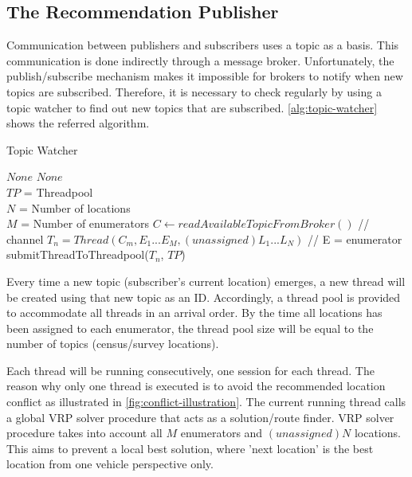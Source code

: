 \documentclass[conference]{IEEEtran}
\begin{document}
\subsection{The Recommendation Publisher}
\label{ssec:recommendation-publisher}
Communication between publishers and subscribers uses a topic as a basis. This communication is done indirectly through a message broker. Unfortunately, the publish/subscribe mechanism makes it impossible for brokers to notify when new topics are subscribed. Therefore, it is necessary to check regularly by using a topic watcher to find out new topics that are subscribed. \autoref{alg:topic-watcher} shows the referred algorithm.

\begin{algorithm}[!]
	\caption{Topic Watcher}
	\label{alg:topic-watcher}
	\begin{algorithmic}[1]
		\renewcommand{\algorithmicrequire}{\textbf{Input:}}
		\renewcommand{\algorithmicensure}{\textbf{Output:}}
		\REQUIRE $None$
		\ENSURE  $None$
		\\ $TP$ = Threadpool
		\\ $N$ = Number of locations
		\\ $M$ = Number of enumerators
		\STATE $C \leftarrow readAvailableTopicFromBroker()$	// channel
		\STATE $T_n = Thread(C_m, E_1...E_M, (unassigned) L_1...L_N)$		// E = enumerator
		\STATE submitThreadToThreadpool($T_n$, $TP$)
		\ENDIF
		\ENDFOR
		\ENDFOR
		\ENDWHILE
	\end{algorithmic}
\end{algorithm}

Every time a new topic (subscriber’s current location) emerges, a new thread will be created using that new topic as an ID. Accordingly, a thread pool is provided to accommodate all threads in an arrival order. By the time all locations has been assigned to each enumerator, the thread pool size will be equal to the number of topics (census/survey locations). 

Each thread will be running consecutively, one session for each thread. The reason why only one thread is executed is to avoid the recommended location conflict as illustrated in \autoref{fig:conflict-illustration}. The current running thread calls a global VRP solver procedure that acts as a solution/route finder. VRP solver procedure takes into account all $M$ enumerators and $(unassigned) N$ locations. This aims to prevent a local best solution, where 'next location' is the best location from one vehicle perspective only.
\end{document}
